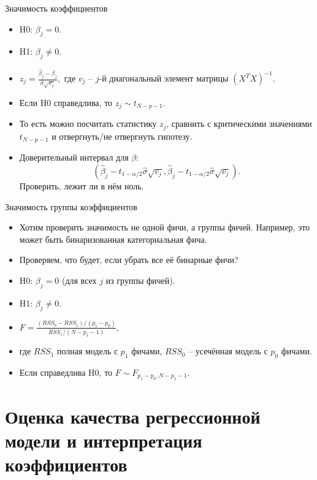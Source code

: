 \documentclass[9pt]{beamer}
\begin{document}
\begin{frame}{Значимость коэффициентов}
    \begin{itemize}
        \item H0: $\beta_j = 0$.
        \item H1: $\beta_j \neq 0$.
        \item $z_j = \frac{\hat\beta_j - \beta_j}{\hat\sigma\sqrt{v_j}},$ где $v_j$ – $j$-й диагональный элемент матрицы $(X^TX)^{-1}$.
        \item Если H0 справедлива, то $z_j\sim t_{N-p-1}$.
        \item То есть можно посчитать статистику $z_j$, сравнить с критическими значениями $t_{N-p-1}$ и отвергнуть/не отвергнуть гипотезу.
        \item Доверительный интервал для $\beta$: $$(\hat\beta_j - t_{1-\alpha/2}\hat\sigma\sqrt{v_j}, \hat\beta_j - t_{1-\alpha/2}\hat\sigma\sqrt{v_j}).$$ Проверить, лежит ли в нём ноль.
    \end{itemize}
\end{frame}

\begin{frame}{Значимость группы коэффициентов}
    \begin{itemize}
        \item Хотим проверить значимость не одной фичи, а группы фичей. Например, это может быть бинаризованная категориальная фича.
        \item Проверяем, что будет, если убрать все её бинарные фичи?
        \item H0: $\beta_j = 0$ (для всех $j$ из группы фичей).
        \item H1: $\beta_j \neq 0$.
        \item $F=\frac{(RSS_0 - RSS_1)/(p_1-p_0)}{RSS_1/(N-p_1-1)},$
        \item где $RSS_1$ полная модель с $p_1$ фичами, $RSS_0$ – усечённая модель с $p_0$ фичами.
        \item Если справедлива H0, то $F\sim F_{p_1-p_0, N-p_1-1}$.
    \end{itemize}
\end{frame}

\section{Оценка качества регрессионной модели и интерпретация коэффициентов}
\end{document}

